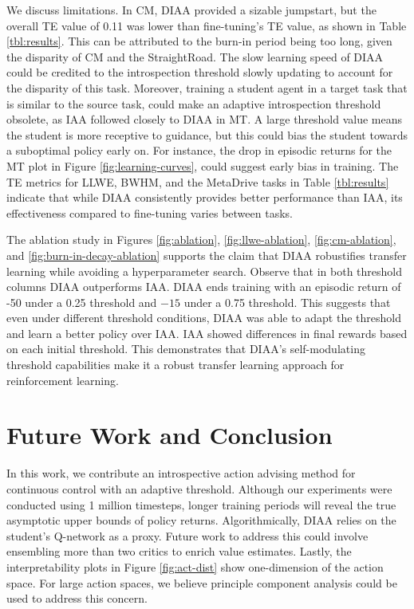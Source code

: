 \documentclass{article} %
\begin{document}
We discuss limitations. In CM, DIAA provided a sizable jumpstart, but the overall TE value of 0.11 was lower than fine-tuning's TE value, as shown in Table \ref{tbl:results}. This can be attributed to the burn-in period being too long, given the disparity of CM and the StraightRoad. The slow learning speed of DIAA could be credited to the introspection threshold slowly updating to account for the disparity of this task. Moreover, training a student agent in a target task that is similar to the source task, could make an adaptive introspection threshold obsolete, as IAA followed closely to DIAA in MT. A large threshold value means the student is more receptive to guidance, but this could bias the student towards a suboptimal policy early on. For instance, the drop in episodic returns for the MT plot in Figure \ref{fig:learning-curves}, could suggest early bias in training. The TE metrics for LLWE, BWHM, and the MetaDrive tasks in Table \ref{tbl:results} indicate that while DIAA consistently provides better performance than IAA, its effectiveness compared to fine-tuning varies between tasks.

The ablation study in Figures \ref{fig:ablation}, \ref{fig:llwe-ablation}, \ref{fig:cm-ablation}, and \ref{fig:burn-in-decay-ablation} supports the claim that DIAA robustifies transfer learning while avoiding a hyperparameter search. Observe that in both threshold columns DIAA outperforms IAA. DIAA ends training with an episodic return of -50 under a 0.25 threshold and $-15$ under a 0.75 threshold. This suggests that even under different threshold conditions, DIAA was able to adapt the threshold and learn a better policy over IAA. IAA showed differences in final rewards based on each initial threshold. This demonstrates that DIAA's self-modulating threshold capabilities make it a robust transfer learning approach for reinforcement learning.

\section{Future Work and Conclusion}
\label{sec:conclusion}

In this work, we contribute an introspective action advising method for continuous control with an adaptive threshold. Although our experiments were conducted using 1 million timesteps, longer training periods will reveal the true asymptotic upper bounds of policy returns. Algorithmically, DIAA relies on the student's Q-network as a proxy. Future work to address this could involve ensembling more than two critics to enrich value estimates. Lastly, the interpretability plots in Figure \ref{fig:act-dist} show one-dimension of the action space. For large action spaces, we believe principle component analysis could be used to address this concern. 
\end{document}
